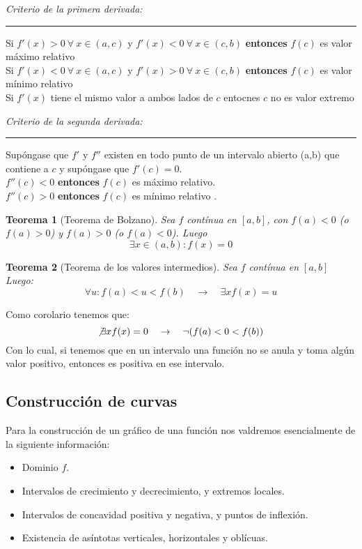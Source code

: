 \documentclass[12pt,a4paper]{extarticle}
\newtheorem{theorem}{Teorema}[section]
\begin{document}
\begin{minipage}{16cm}
\begin{center}
\emph{Criterio de la primera derivada:}
\end{center}
\hrule
\vspace{1cm}
Si \(f'(x)>0 \ \forall \ x \in (a,c)\) y \(f'(x)<0 \ \forall \ x \in
(c,b)\) \textbf{entonces} \(f(c)\) es valor m\'aximo relativo \\[1em]
Si \(f'(x)<0 \ \forall \ x \in (a,c)\) y \(f'(x)>0 \ \forall \ x \in
(c,b)\) \textbf{entonces} \(f(c)\) es valor m\'inimo relativo \\[1em]
Si \(f'(x)\) tiene el mismo valor a ambos lados de \(c\) entocnes \(c\) no es
valor extremo\\
\vspace{0.5em}
\end{minipage}
\vspace{2em}

\begin{minipage}{16cm}
\begin{center}
\emph{Criterio de la segunda derivada:}
\end{center}
\hrule
\vspace{1em}
Sup\'ongase que \(f'\) y \(f''\) existen en todo punto de un intervalo
abierto (a,b) que contiene a \(c\) y sup\'ongase que \(f'(c)=0\).\\[1em]
\(f''(c) < 0\) \textbf{entonces} \(f(c)\) es m\'aximo relativo. \\[1em]
\(f''(c) > 0\) \textbf{entonces} \(f(c)\) es m\'inimo relativo .\\[1em]
\end{minipage}
\begin{theorem}[Teorema de Bolzano]
Sea \(f\) cont\'inua en \([a,b]\), con \(f(a) < 0\) (o \(f(a) > 0\)) y
\(f(a) > 0 \) (o \(f(a) < 0\)). Luego
\[\exists x \in (a,b) : f(x) = 0\]
\end{theorem}
\begin{theorem}[Teorema de los valores intermedios]
Sea \(f\) cont\'inua en \([a,b]\) Luego:
\[\forall u : f(a) < u < f(b) \quad \to \quad \exists x  f(x) = u \]
\end{theorem}
Como corolario tenemos que:
\[\not \exists x f(x) = 0 \quad \to \quad  \neg (f(a) < 0 < f(b))\]
Con lo cual, si tenemos que en un intervalo una función no se anula y
toma alg\'un valor positivo, entonces es positiva en ese intervalo.

\subsection{Construcci\'on de curvas}
Para la construcci\'on de un gr\'afico de una funci\'on nos valdremos
esencialmente de la siguiente informaci\'on:
\begin{itemize}
  \item Dominio \(f\).
  \item Intervalos de crecimiento y decrecimiento, y extremos locales.
  \item Intervalos de concavidad positiva y negativa, y puntos de inflexi\'on.
  \item Existencia de as\'intotas verticales, horizontales y obl\'icuas.
\end{itemize}
\end{document}
